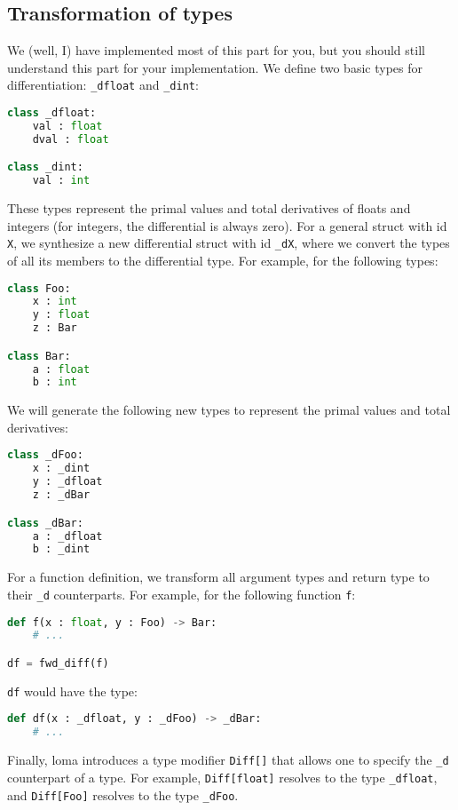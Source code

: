 \subsection{Transformation of types}
We (well, I) have implemented most of this part for you, but you should still understand this part for your implementation. We define two basic types for differentiation: \lstinline{_dfloat} and \lstinline{_dint}:
\begin{lstlisting}[language=Python]
class _dfloat:
    val : float
    dval : float

class _dint:
    val : int
\end{lstlisting}
These types represent the primal values and total derivatives of floats and integers (for integers, the differential is always zero). For a general struct with id \lstinline{X}, we synthesize a new differential struct with id \lstinline{_dX}, where we convert the types of all its members to the differential type. For example, for the following types:
\begin{lstlisting}[language=Python]
class Foo:
    x : int
    y : float
    z : Bar

class Bar:
    a : float
    b : int
\end{lstlisting}
We will generate the following new types to represent the primal values and total derivatives:
\begin{lstlisting}[language=Python]
class _dFoo:
    x : _dint
    y : _dfloat
    z : _dBar

class _dBar:
    a : _dfloat
    b : _dint
\end{lstlisting}

For a function definition, we transform all argument types and return type to their \lstinline{_d} counterparts. For example, for the following function \lstinline{f}:
\begin{lstlisting}[language=Python]
def f(x : float, y : Foo) -> Bar:
    # ...

df = fwd_diff(f)
\end{lstlisting}
\lstinline{df} would have the type:
\begin{lstlisting}[language=Python]
def df(x : _dfloat, y : _dFoo) -> _dBar:
    # ...
\end{lstlisting}

Finally, loma introduces a type modifier \lstinline{Diff[]} that allows one to specify the \lstinline{_d} counterpart of a type. For example, \lstinline{Diff[float]} resolves to the type \lstinline{_dfloat}, and \lstinline{Diff[Foo]} resolves to the type \lstinline{_dFoo}. 

